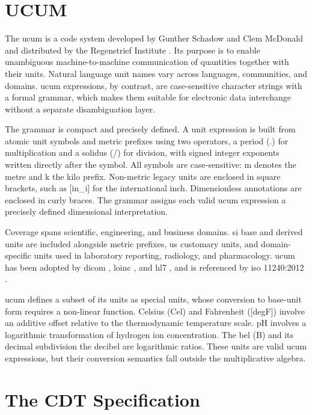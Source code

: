 \section{UCUM}

The \ac{ucum} is a code system developed by Gunther Schadow and Clem McDonald and distributed by the Regenstrief Institute \cite{schadow_ucum}. 
Its purpose is to enable unambiguous machine-to-machine communication of quantities together with their units. 
Natural language unit names vary across languages, communities, and domains. 
\ac{ucum} expressions, by contrast, are case-sensitive character strings with a formal grammar, which makes them suitable for electronic data interchange without a separate disambiguation layer.

The grammar is compact and precisely defined. 
A unit expression is built from atomic unit symbols and metric prefixes using two operators, a period (.) for multiplication and a solidus (/) for division, with signed integer exponents written directly after the symbol. 
All symbols are case-sensitive: m denotes the metre and k the kilo prefix. 
Non-metric legacy units are enclosed in square brackets, such as \textsf{[in\_i]} for the international inch. 
Dimensionless annotations are enclosed in curly braces. 
The grammar assigns each valid \ac{ucum} expression a precisely defined dimensional interpretation.

Coverage spans scientific, engineering, and business domains. 
\ac{si} base and derived units are included alongside metric prefixes, \ac{us} customary units, and domain-specific units used in laboratory reporting, radiology, and pharmacology. 
\ac{ucum} has been adopted by \ac{dicom} \cite{nema_dicom}, \ac{loinc} \cite{mcdonald2003loinc}, and \ac{hl7} \cite{hl7_fhir_quantity}, and is referenced by \ac{iso} 11240:2012 \cite{iso2012_11240}.

\ac{ucum} defines a subset of its units as special units, whose conversion to base-unit form requires a non-linear function. 
Celsius (Cel) and Fahrenheit (\textsf{[degF]}) involve an additive offset relative to the thermodynamic temperature scale. 
pH involves a logarithmic transformation of hydrogen ion concentration. 
The bel (B) and its decimal subdivision the decibel are logarithmic ratios. 
These units are valid \ac{ucum} expressions, but their conversion semantics fall outside the multiplicative algebra.

\section{The CDT Specification}

